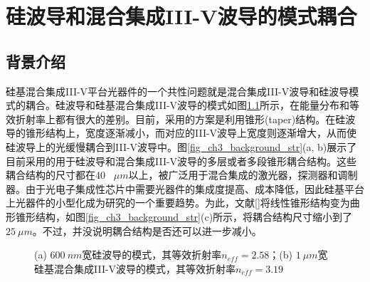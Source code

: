 \chapter{硅波导和混合集成III-V波导的模式耦合}
\section{背景介绍}
硅基混合集成III-V平台光器件的一个共性问题就是混合集成III-V波导和硅波导模式的耦合。硅波导和硅基混合集成III-V波导的模式如图\ref{fig_ch3_si_hybrid_mode}所示，在能量分布和等效折射率上都有很大的差别。目前，采用的方案是利用锥形(taper)结构。在硅波导的锥形结构上，宽度逐渐减小，而对应的III-V波导上宽度则逐渐增大，从而使硅波导上的光缓慢耦合到III-V波导中。图\ref{fig_ch3_background_str}(a, b)展示了目前采用的用于硅波导和混合集成III-V波导的多层或者多段锥形耦合结构\cite{kurczveil2013characterization, keyvaninia2009engineering}。这些耦合结构的尺寸都在40 ~$\mu m$以上，被广泛用于混合集成的激光器，探测器和调制器。由于光电子集成性芯片中需要光器件的集成度提高、成本降低，因此硅基平台上光器件的小型化成为研究的一个重要趋势。为此，文献[]将线性锥形结构变为曲形锥形结构，如图\ref{fig_ch3_background_str}(c)所示，将耦合结构尺寸缩小到了$25~\mu m$。不过，并没说明耦合结构是否还可以进一步减小。
\begin{figure}[htb]
	\small
	\caption{(a) $600~nm$宽硅波导的模式，其等效折射率$n_{eff}=2.58$；(b) $1~\mu m$宽硅基混合集成III-V波导的模式，其等效折射率$n_{eff}=3.19$}
	\label{fig_ch3_si_hybrid_mode}	
\end{figure}
		
